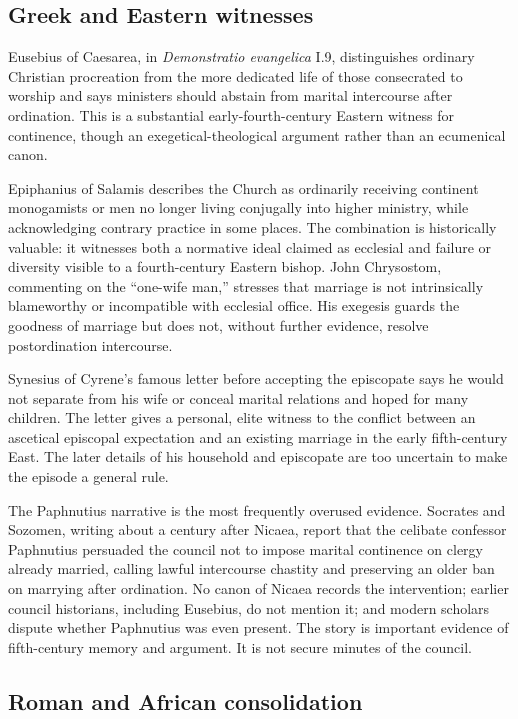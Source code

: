\subsection{Greek and Eastern witnesses}

Eusebius of Caesarea, in \emph{Demonstratio evangelica} I.9, distinguishes ordinary Christian procreation from the more dedicated life of those consecrated to worship and says ministers should abstain from marital intercourse after ordination. This is a substantial early-fourth-century Eastern witness for continence, though an exegetical-theological argument rather than an ecumenical canon.

Epiphanius of Salamis describes the Church as ordinarily receiving continent monogamists or men no longer living conjugally into higher ministry, while acknowledging contrary practice in some places. The combination is historically valuable: it witnesses both a normative ideal claimed as ecclesial and failure or diversity visible to a fourth-century Eastern bishop. John Chrysostom, commenting on the ``one-wife man,'' stresses that marriage is not intrinsically blameworthy or incompatible with ecclesial office. His exegesis guards the goodness of marriage but does not, without further evidence, resolve postordination intercourse.

Synesius of Cyrene's famous letter before accepting the episcopate says he would not separate from his wife or conceal marital relations and hoped for many children. The letter gives a personal, elite witness to the conflict between an ascetical episcopal expectation and an existing marriage in the early fifth-century East. The later details of his household and episcopate are too uncertain to make the episode a general rule.

The Paphnutius narrative is the most frequently overused evidence. Socrates and Sozomen, writing about a century after Nicaea, report that the celibate confessor Paphnutius persuaded the council not to impose marital continence on clergy already married, calling lawful intercourse chastity and preserving an older ban on marrying after ordination. No canon of Nicaea records the intervention; earlier council historians, including Eusebius, do not mention it; and modern scholars dispute whether Paphnutius was even present. The story is important evidence of fifth-century memory and argument. It is not secure minutes of the council.

\subsection{Roman and African consolidation}

